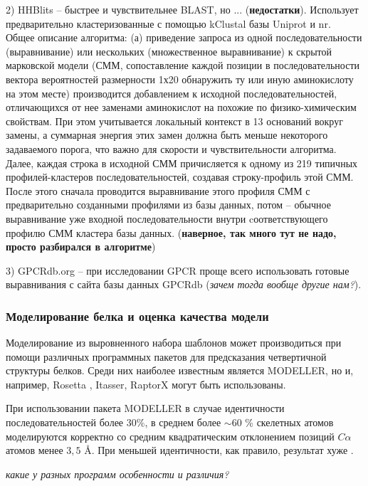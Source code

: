 \documentclass[a4paper,14pt]{extreport}
\begin{document}
	2) HHBlits \cite{Remmert2011} -- быстрее и чувствительнее BLAST, но ... (\textbf{недостатки}). Использует предварительно кластеризованные с помощью kClustal \cite{Hauser2013} базы Uniprot и nr. \\
	Общее описание алгоритма: (а) приведение запроса из одной последовательности (выравнивание) или нескольких (множественное выравнивание) к скрытой марковской модели (СММ, сопоставление каждой позиции в последовательности вектора вероятностей размерности 1х20 обнаружить ту или иную аминокислоту на этом месте) производится добавлением к исходной  последовательностей, отличающихся от нее заменами аминокислот на похожие по физико-химическим свойствам. При этом учитывается локальный контекст в 13 оснований вокруг замены, а суммарная энергия этих замен должна быть меньше некоторого задаваемого порога, что важно для скорости и чувствительности алгоритма. Далее, каждая строка в исходной СММ причисляется к одному из 219 типичных профилей-кластеров последовательностей, создавая строку-профиль этой СММ. После этого сначала проводится выравнивание этого профиля СММ с предварительно созданными профилями из базы данных, потом -- обычное выравнивание уже входной последовательности внутри cоответствующего профилю СММ кластера базы данных. (\textbf{наверное, так много тут не надо, просто разбирался в алгоритме})
	
	3) GPCRdb.org -- при исследовании GPCR проще всего использовать готовые выравнивания с сайта базы данных GPCRdb (\textit{зачем тогда вообще другие нам?}).
	\subsubsection{Моделирование белка и оценка качества модели}
	
	Моделирование из выровненного набора шаблонов может производиться при помощи различных программных пакетов для предсказания четвертичной структуры белков. Среди них наиболее известным является MODELLER, но и, например, Rosetta \cite{ROHL200466} \cite{ Song2013}, Itasser\cite{iTasser}, RaptorX\cite{Raptor} могут быть использованы.
	\cite{Deng}
	
	При использовании пакета MODELLER в случае идентичности последовательностей более $30 \%$, в среднем более $\sim 60$ \% скелетных атомов моделируются корректно со средним квадратическим отклонением позиций $C \alpha$ атомов менее $3,5$ \AA. При меньшей идентичности, как правило, результат хуже \cite{Webb2017}.

	\textit{какие у разных программ особенности и различия?}
	
\end{document}
